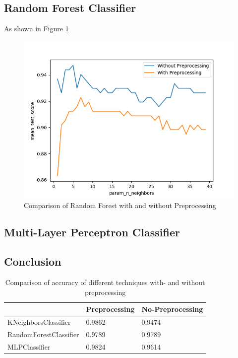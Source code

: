 \subsection{Random Forest Classifier}

As shown in Figure \ref{fig:breast-rf-comparison}

\begin{figure}[H]
  \begin{center}
    \includegraphics[width=0.8\linewidth]{breast/plots/knn_feature_comparision.png}
    \caption{Comparison of Random Forest with and without Preprocessing}
    \label{fig:breast-rf-comparison}
  \end{center}
\end{figure}

\subsection{Multi-Layer Perceptron Classifier}


\subsection{Conclusion}

\begin{table}[H]
\begin{center}
\begin{tabular}{|l|l|l|}
\hline
                       & Preprocessing & No-Preprocessing \\ \hline
KNeighborsClassifier   & 0.9862        & 0.9474           \\ \hline
RandomForestClassifier & 0.9789        & 0.9789           \\ \hline
MLPClassifier          & 0.9824        & 0.9614           \\ \hline
\end{tabular}
\caption{Comparison of accuracy of different techniques with- and without preprocessing}
\end{center}
\end{table}

